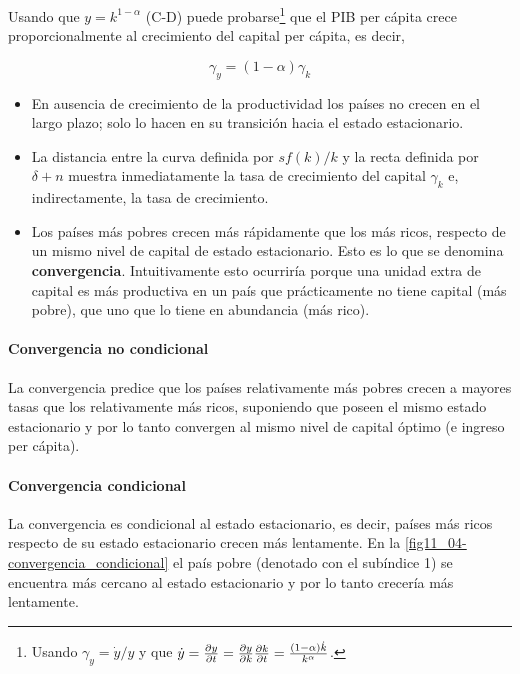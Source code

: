 \documentclass[DeGregorioResumen]{subfiles}
\begin{document}
Usando que $y=k^{1-\alpha}$ (C-D) puede probarse\footnote{Usando $\gamma_y=\dot y / y$ y que $\dot y = \frac{\partial y}{\partial t} = \frac{\partial y}{\partial k} \frac{\partial k}{\partial t} = \frac{(1-\alpha)\dot k}{k^\alpha} $.} que el PIB per cápita crece proporcionalmente al crecimiento del capital per cápita, es decir,

\begin{equation}
\gamma_y = (1-\alpha)\gamma_k
\end{equation}

\begin{itemize}
\item En ausencia de crecimiento de la productividad los países no crecen en el largo plazo; solo lo hacen en su transición hacia el estado estacionario.
\item La distancia entre la curva definida por $sf(k)/k$ y la recta definida por $\delta +n$ muestra inmediatamente la tasa de crecimiento del capital $\gamma_k$ e, indirectamente, la tasa de crecimiento.
\item Los países más pobres crecen más rápidamente que los más ricos, respecto de un mismo nivel de capital de estado estacionario. Esto es lo que se denomina \textbf{convergencia}. Intuitivamente esto ocurriría porque una unidad extra de capital es más productiva en un país que prácticamente no tiene capital (más pobre), que uno que lo tiene en abundancia (más rico).
\end{itemize}

\paragraph{Convergencia no condicional}
La convergencia predice que los países relativamente más pobres crecen a mayores tasas que los relativamente más ricos, suponiendo que poseen el mismo estado estacionario y por lo tanto convergen al mismo nivel de capital óptimo (e ingreso per cápita).

\paragraph{Convergencia condicional}
La convergencia es condicional al estado estacionario, es decir, países más ricos respecto de su estado estacionario crecen más lentamente. En la \autoref{fig11_04-convergencia_condicional} el país pobre (denotado con el subíndice 1) se encuentra más cercano al estado estacionario y por lo tanto crecería más lentamente.


\end{document}
